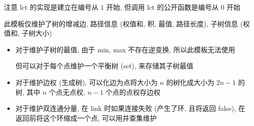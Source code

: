 注意 lct 的实现是建立在编号从 \(1\) 开始, 但调用 lct 的公开函数是编号从 \(0\) 开始

此模板仅维护了树的增减边, 路径信息 (权值和, 积, 最值, 路径长度), 子树信息 (权值和, 子树大小)

\begin{itemize}
    \item 对于维护子树的最值, 由于 min, max 不存在逆变换, 所以此模板无法使用
    
          但可以对于每个点维护一个平衡树 (set), 来存储其子树最值
    
    \item 对于维护边权 (生成树), 可以化边为点将大小为 \(n\) 的树化成大小为 \(2n - 1\) 的树, 其中 \(n\) 个点无点权, \(n-1\) 个点的点权存边权
    \item 对于维护双连通分量, 在 link 时如果连接失败 (产生了环, 且将返回 false), 在返回前将这个环缩成一个点, 可以用并查集维护
\end{itemize}
